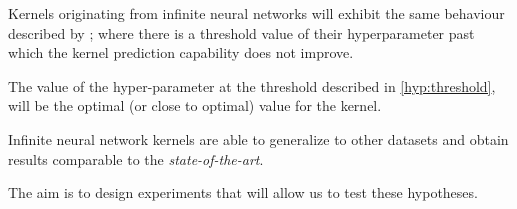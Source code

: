 \begin{hypothesis}\label{hyp:threshold}
    Kernels originating from infinite neural networks will
    exhibit the same behaviour described by \textcite{frenayParameterinsensitiveKernelExtreme2011};
    where there is a threshold value of their hyperparameter past which
    the kernel prediction capability does not improve.
\end{hypothesis}

\begin{hypothesis}
    The value of the hyper-parameter at the threshold described in \ref{hyp:threshold}, will
    be the optimal (or close to optimal) value for the kernel.
\end{hypothesis}

\begin{hypothesis}
    Infinite neural network kernels are able to generalize to other datasets and obtain
    results comparable to the \emph{state-of-the-art}.
\end{hypothesis}

The aim is to design experiments that will allow us to test these hypotheses.
